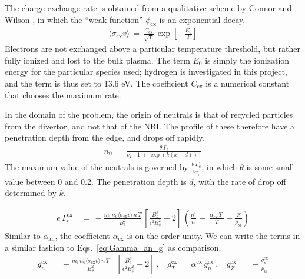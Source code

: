 The charge exchange rate is obtained from a qualitative scheme by Connor and Wilson \cite{connor_review_2000}, in which the ``weak function'' $\phi_\text{cx}$ is an exponential decay.
\begin{align} %
	\langle \sigma_\text{cx} v\rangle \,=\, \frac{C_\text{cx}}{\sqrt{T}} \,
		\exp\left[-\frac{E_0}{T}\right] \label{eq:cx_rate}
\end{align}
Electrons are not exchanged above a particular temperature threshold, but rather fully ionized and lost to the bulk plasma.
The term $E_0$ is simply the ionization energy for the particular species used; hydrogen is investigated in this project, and the term is thus set to 13.6 eV.
The coefficient $C_\text{cx}$ is a numerical constant that chooses the maximum rate.

In the domain of the problem, the origin of neutrals is that of recycled particles from the divertor, and not that of the NBI.
The profile of these therefore have a penetration depth from the edge, and drops off rapidly.
\begin{align} %
	n_0 \,=\, \frac{\theta\,\Gamma_c}{v_{T_i}\left[1 \,+\,
	\exp{(k(x - d))}\right]} \label{eq:neutral_density}
\end{align}
The maximum value of the neutrals is governed by $\frac{\theta\,\Gamma_c}{v_{T_i}}$, in which $\theta$ is some small value between 0 and 0.2.
The penetration depth is $d$, with the rate of drop off determined by $k$.

\begin{align} %
	e\,\Gamma_e^\text{cx} \,&=\,
		-\frac{m_i \,n_0 \langle\sigma_\text{cx} v\rangle \, n\,T}{B_\theta^2}
		\, \left[\frac{B_\theta^2}{\epsilon^2 B_\phi^2} + 2\right] \,
		\left(\frac{n^\prime}{n} \,+\, \frac{\alpha_\text{cx}\,T^\prime}
		{T} - \frac{Z}{\rho_{\theta i}}\right) \label{eq:Gamma_cx}
\end{align}
Similar to $\alpha_\text{an}$, the coefficient $\alpha_\text{cx}$ is on the order unity.
We can write the terms in a similar fashion to Eqs.~\ref{eq:Gamma_an_g} as comparison.
\begin{align} %
	g_n^\text{cx} \,=\, -\frac{m_i \,n_0 \langle\sigma_\text{cx} v\rangle \, n \, T}
		{B_\theta^2}& \left[\frac{B_\theta^2}{\epsilon^2 B_\phi^2} + 2\right]
		~,~~~~ g_T^\text{cx} \,=\, \alpha^\text{cx}\,g_n^\text{cx}~,~~~~
		g_Z^\text{cx} \,=\, -\frac{g_n^\text{cx}}{\rho_{\theta i}}
		\label{eq:g_cx}
\end{align}


